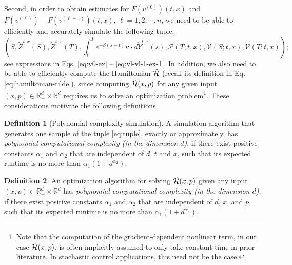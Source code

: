 \documentclass[11pt]{article}
\theoremstyle{definition}
\newtheorem{assumption}{Assumption}[section]
\newtheorem{definition}[assumption]{Definition}
\theoremstyle{plain}
\newcommand{\R}{\mathbb{R}}
\newcommand{\cH}{{\cal H}}
\begin{document}
Second, in order to obtain estimates for $\bar F\left(v^{(0)}\right)(t,x)$ 
and $\bar F\left(v^{(\ell)}\right)-\bar F\left(v^{(\ell-1)}\right)(t, x)$, $\ell = 1, 2, \cdots, n$, 
we need to be able to efficiently and accurately simulate the following tuple: 
\begin{equation}\label{eq:tuple}
  \left(S, \tilde{Z}^{t,x}(S), \tilde{Z}^{t,x}(T), \int_t^T e^{-\beta (s-t)}\kappa\cdot d\tilde Y^{t,x}(s), \mathcal{P}(T; t,x), \mathcal{V}(S; t,x), \mathcal{V}(T; t,x)\right);
  \end{equation}
see expressions in Eqs. \eqref{eq:v0-ex} -- \eqref{eq:vl-vl-1-ex-1}. 
In addition, we also need to be able to efficiently compute the Hamiltonian $\tilde \cH$ (recall its definition in Eq. \eqref{eq:hamiltonian-tilde}), 
since computing $\tilde \cH(x,p)$ for any given input $(x,p) \in \R_+^d \times \R^d$ requires us to solve an optimization problem\footnote{Note 
that the computation of the gradient-dependent nonlinear term, in our case $\tilde \cH(x,p)$, is often implicitly assumed to only take constant time 
in prior literature. In stochastic control applications, this need not be the case.}. 
These considerations motivate the following definitions. 
\begin{definition}[Polynomial-complexity simulation]\label{df:poly-sim}
A simulation algorithm that generates one sample of the tuple \eqref{eq:tuple}, exactly or approximately, 
has \emph{polynomial computational complexity (in the dimension $d$)}, if there exist positive constants $\alpha_1$ and $\alpha_2$ 
that are independent of $d$, $t$ and $x$, 
such that its expected runtime is no more than $\alpha_1\left(1+d^{\alpha_2}\right)$. 
\end{definition}
\begin{definition}\label{df:poly-opt}
An optimization algorithm for solving $\tilde \cH (x,p)$ given any input $(x,p) \in \R_+^d \times \R^d$ 
has \emph{polynomial computational complexity (in the dimension $d$)}, if there exist positive constants $\alpha_1$ and $\alpha_2$ 
that are independent of $d$, $x$, and $p$, 
such that its expected runtime is no more than $\alpha_1\left(1+d^{\alpha_2}\right)$. 
\end{definition}
\end{document}
